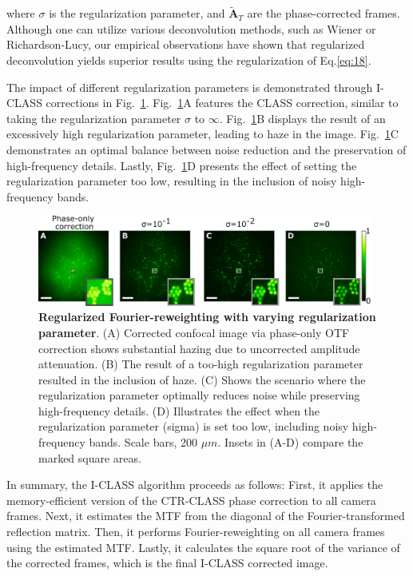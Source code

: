 \documentclass[pdflatex,sn-mathphys-num,Numbered]{sn-jnl}%
\theoremstyle{thmstyleone}%
\theoremstyle{thmstyletwo}%
\theoremstyle{thmstylethree}%
\begin{document}
\noindent where $\sigma$ is the regularization parameter, and $\tilde{\textbf{A}}_T$ are the phase-corrected frames.
Although one can utilize various deconvolution methods, such as Wiener or Richardson-Lucy, our empirical observations have shown that regularized deconvolution yields superior results using the regularization of Eq.\ref{eq:18}.

The impact of different regularization parameters is demonstrated through I-CLASS corrections in Fig.~\ref{fig1_supp}. Fig.~\ref{fig1_supp}A features the CLASS correction, similar to taking the regularization parameter $\sigma $ to $\infty$. Fig.~\ref{fig1_supp}B displays the result of an excessively high regularization parameter, leading to haze in the image. Fig.~\ref{fig1_supp}C demonstrates an optimal balance between noise reduction and the preservation of high-frequency details. Lastly, Fig.~\ref{fig1_supp}D presents the effect of setting the regularization parameter too low, resulting in the inclusion of noisy high-frequency bands.

\begin{figure}[ht!]
	\centering
	\includegraphics [width=0.98\textwidth,]
	{supp_figures/figure_S5.pdf}
        \renewcommand{\thefigure}{S5}
    \caption{\textbf{Regularized Fourier-reweighting with varying regularization parameter}. (A) Corrected confocal image via phase-only OTF correction shows substantial hazing due to uncorrected amplitude attenuation. (B) The result of a too-high regularization parameter resulted in the inclusion of haze. (C) Shows the scenario where the regularization parameter optimally reduces noise while preserving high-frequency details. (D) Illustrates the effect when the regularization parameter (sigma) is set too low, including noisy high-frequency bands. Scale bars, 200 $\mu m$. Insets in (A-D) compare the marked square areas.}\label{fig1_supp}
\end{figure} 
\noindent In summary, the I-CLASS algorithm proceeds as follows: First, it applies the memory-efficient version of the CTR-CLASS phase correction to all camera frames. Next, it estimates the MTF from the diagonal of the Fourier-transformed reflection matrix. Then, it performs Fourier-reweighting on all camera frames using the estimated MTF. Lastly, it calculates the square root of the variance of the corrected frames, which is the final I-CLASS corrected image.
\end{document}
